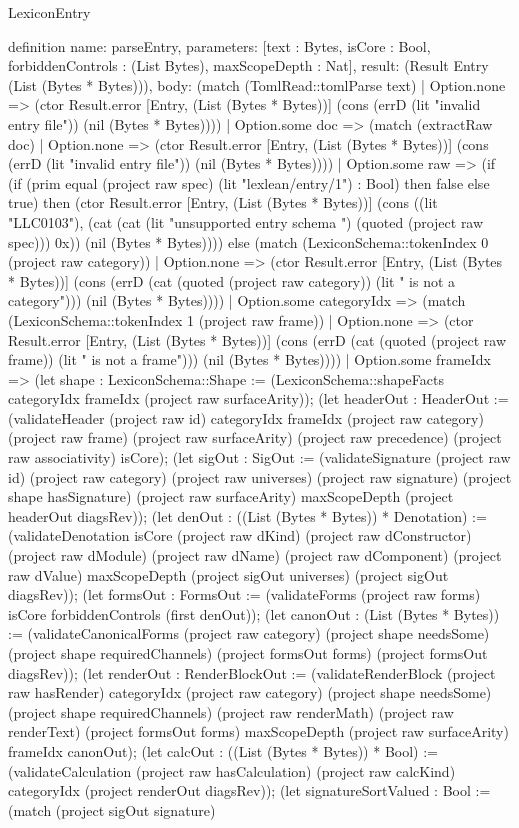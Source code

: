 \begin{lexlean}{LexiconEntry}
\begin{semanticmodule}
definition{
  name: parseEntry,
  parameters: [text : Bytes, isCore : Bool, forbiddenControls : (List Bytes), maxScopeDepth : Nat],
  result: (Result Entry (List (Bytes * Bytes))),
  body: (match (TomlRead::tomlParse text)
    | Option.none => (ctor Result.error [Entry, (List (Bytes * Bytes))] (cons (errD (lit "invalid entry file")) (nil (Bytes * Bytes))))
    | Option.some doc => (match (extractRaw doc)
      | Option.none => (ctor Result.error [Entry, (List (Bytes * Bytes))] (cons (errD (lit "invalid entry file")) (nil (Bytes * Bytes))))
      | Option.some raw => (if (if (prim equal (project raw spec) (lit "lexlean/entry/1") : Bool) then false else true) then (ctor Result.error [Entry, (List (Bytes * Bytes))] (cons ((lit "LLC0103"), (cat (cat (lit "unsupported entry schema ") (quoted (project raw spec))) 0x)) (nil (Bytes * Bytes)))) else (match (LexiconSchema::tokenIndex 0 (project raw category))
        | Option.none => (ctor Result.error [Entry, (List (Bytes * Bytes))] (cons (errD (cat (quoted (project raw category)) (lit " is not a category"))) (nil (Bytes * Bytes))))
        | Option.some categoryIdx => (match (LexiconSchema::tokenIndex 1 (project raw frame))
          | Option.none => (ctor Result.error [Entry, (List (Bytes * Bytes))] (cons (errD (cat (quoted (project raw frame)) (lit " is not a frame"))) (nil (Bytes * Bytes))))
          | Option.some frameIdx => (let shape : LexiconSchema::Shape := (LexiconSchema::shapeFacts categoryIdx frameIdx (project raw surfaceArity)); (let headerOut : HeaderOut := (validateHeader (project raw id) categoryIdx frameIdx (project raw category) (project raw frame) (project raw surfaceArity) (project raw precedence) (project raw associativity) isCore); (let sigOut : SigOut := (validateSignature (project raw id) (project raw category) (project raw universes) (project raw signature) (project shape hasSignature) (project raw surfaceArity) maxScopeDepth (project headerOut diagsRev)); (let denOut : ((List (Bytes * Bytes)) * Denotation) := (validateDenotation isCore (project raw dKind) (project raw dConstructor) (project raw dModule) (project raw dName) (project raw dComponent) (project raw dValue) maxScopeDepth (project sigOut universes) (project sigOut diagsRev)); (let formsOut : FormsOut := (validateForms (project raw forms) isCore forbiddenControls (first denOut)); (let canonOut : (List (Bytes * Bytes)) := (validateCanonicalForms (project raw category) (project shape needsSome) (project shape requiredChannels) (project formsOut forms) (project formsOut diagsRev)); (let renderOut : RenderBlockOut := (validateRenderBlock (project raw hasRender) categoryIdx (project raw category) (project shape needsSome) (project shape requiredChannels) (project raw renderMath) (project raw renderText) (project formsOut forms) maxScopeDepth (project raw surfaceArity) frameIdx canonOut); (let calcOut : ((List (Bytes * Bytes)) * Bool) := (validateCalculation (project raw hasCalculation) (project raw calcKind) categoryIdx (project renderOut diagsRev)); (let signatureSortValued : Bool := (match (project sigOut signature)
}
\end{semanticmodule}
\end{lexlean}
